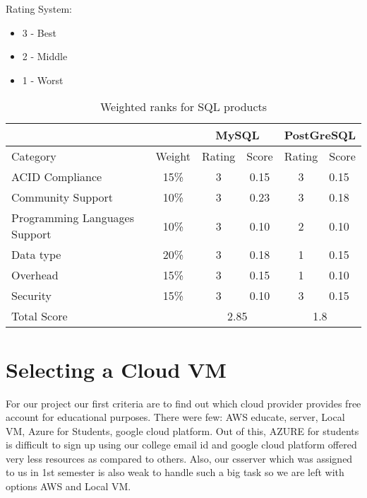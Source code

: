 \documentclass{article}
\begin{document}

Rating System:

\begin{itemize}
    \item 3 - Best
    \item 2 - Middle
    \item 1 - Worst
\end{itemize}

\begin{table}[htbp]
\caption {Weighted ranks for SQL products}
\begin{tabular}{lc|c|c|c|l|}
\cline{3-6}
                                    &        & \multicolumn{2}{c|}{MySQL} & \multicolumn{2}{c|}{PostGreSQL}  \\ \hline
\multicolumn{1}{|l|}{Category}      & Weight & Rating        & Score       & Rating       & Score   \\ \hline
\multicolumn{1}{|l|}{ACID Compliance} & 15\%   & 3             & 0.15        & 3            & 0.15  \\ \hline
\multicolumn{1}{|l|}{Community Support} & 10\%   & 3             & 0.23        & 3            & 0.18 \\ \hline
\multicolumn{1}{|l|}{Programming Languages Support}     & 10\%   & 3             & 0.10         & 2            & 0.10  \\ \hline
\multicolumn{1}{|l|}{Data type}  & 20\%   & 3             & 0.18        & 1            & 0.15     \\ \hline
\multicolumn{1}{|l|}{Overhead}       & 15\%   & 3             & 0.15         & 1            & 0.10        \\ \hline
\multicolumn{1}{|l|}{Security}   & 15\%    & 3             & 0.10        & 3            & 0.15      \\ \hline
\multicolumn{2}{|l|}{Total Score}            & \multicolumn{2}{c|}{2.85}   & \multicolumn{2}{c|}{1.8}     \\ \hline
\end{tabular}
\end{table}







\section{Selecting a Cloud VM}

For our project our first criteria are to find out which cloud provider provides free account for educational purposes. There were few: AWS educate, server, Local VM, Azure for Students, google cloud platform. Out of this, AZURE for students is difficult to sign up using our college email id and google cloud platform offered very less resources as compared to others. Also, our csserver which was assigned to us in 1st semester is also weak to handle such a big task so we are left with options AWS and Local VM.
\end{document}
